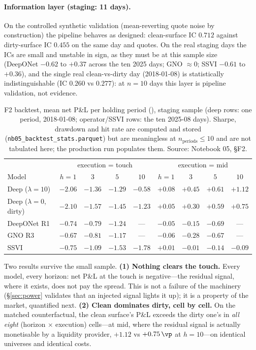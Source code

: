 \paragraph{Information layer (staging: 11 days).} On the controlled synthetic validation
(mean-reverting quote noise by construction) the pipeline behaves as designed: clean-surface
IC $0.712$ against dirty-surface IC $0.455$ on the same day and quotes. On the real staging
days the ICs are small and unstable in sign, as they must be at this sample size (DeepONet
$-0.62$ to $+0.37$ across the ten 2025 days; GNO $\approx0$; SSVI $-0.61$ to $+0.36$), and
the single real clean-vs-dirty day (2018-01-08) is statistically indistinguishable
(IC $0.260$ vs $0.277$): at $n=10$ days this layer is pipeline validation, not evidence.

\begin{table}[htbp]\centering\small
\caption{F2 backtest, mean net P\&L per holding period (\vp), staging sample (deep rows:
one period, 2018-01-08; operator/SSVI rows: the ten 2025-08 days). Sharpe, drawdown and hit
rate are computed and stored (\texttt{nb05\_backtest\_stats.parquet}) but are meaningless at
$n_{\mathrm{periods}}\le10$ and are not tabulated here; the production run populates them.
Source: Notebook 05, \S F2.}
\label{tab:f2}
\begin{tabular}{lcccc@{\qquad}cccc}
\toprule
 & \multicolumn{4}{c}{execution = touch} & \multicolumn{4}{c}{execution = mid} \\
Model & $h{=}1$ & $3$ & $5$ & $10$ & $h{=}1$ & $3$ & $5$ & $10$ \\
\midrule
Deep ($\lambda{=}10$) & $-2.06$ & $-1.36$ & $-1.29$ & $-0.58$ & $+0.08$ & $+0.45$ & $+0.61$ & $+1.12$ \\
Deep ($\lambda{=}0$, dirty) & $-2.10$ & $-1.57$ & $-1.45$ & $-1.23$ & $+0.05$ & $+0.30$ & $+0.59$ & $+0.75$ \\
DeepONet R1 & $-0.74$ & $-0.79$ & $-1.24$ & --- & $-0.05$ & $-0.15$ & $-0.69$ & --- \\
GNO R3 & $-0.67$ & $-0.81$ & $-1.17$ & --- & $-0.06$ & $-0.28$ & $-0.67$ & --- \\
SSVI & $-0.75$ & $-1.09$ & $-1.53$ & $-1.78$ & $+0.01$ & $-0.01$ & $-0.14$ & $-0.09$ \\
\bottomrule
\end{tabular}
\end{table}

Two results survive the small sample. \textbf{(1) Nothing clears the touch.} Every model,
every horizon: net P\&L at the touch is negative---the residual signal, where it exists,
does not pay the spread. This is not a failure of the machinery
(\S\ref{sec:power} validates that an injected signal lights it up); it is a property of the
market, quantified next. \textbf{(2) Clean dominates dirty, cell by cell.} On the matched
counterfactual, the clean surface's P\&L exceeds the dirty one's in \emph{all eight}
(horizon $\times$ execution) cells---at mid, where the residual signal is actually
monetisable by a liquidity provider, $+1.12$ vs $+0.75\,\vp$ at $h=10$---on identical
universes and identical costs.

